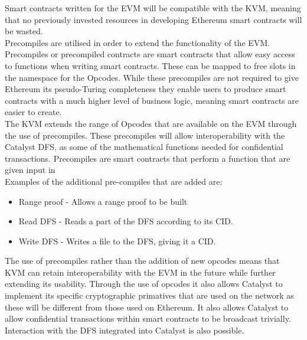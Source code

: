 Smart contracts written for the EVM will be compatible with the KVM, meaning that no previously invested resources in developing Ethereum smart contracts will be wasted.  \\

Precompiles are utilised in order to extend the functionality of the EVM. Precompiles or precompiled contracts are smart contracts that allow easy access to functions when writing smart contracts. These can be mapped to free slots in the namespace for the Opcodes. While these precompiles are not required to give Ethereum its pseudo-Turing completeness they enable users to produce smart contracts with a much higher level of business logic, meaning smart contracts are easier to create. \\

The KVM extends the range of Opcodes that are available on the EVM through the use of precompiles. These precompiles will allow interoperability with the Catalyst DFS, as some of the mathematical functions needed for confidential transactions. Precompiles are smart contracts that perform a function that are given input in\\

Examples of the additional pre-compiles that are added are: \\

\begin{itemize} 
\item Range proof - Allows a range proof to be built 
\item Read DFS - Reads a part of the DFS according to its CID.
\item Write DFS - Writes a file to the DFS, giving it a CID. \\
\end{itemize} 

The use of precompiles rather than the addition of new opcodes means that KVM can retain interoperability with the EVM in the future while further extending its usability. Through the use of opcodes it also allows Catalyst to implement its specific cryptographic primatives that are used on the network as these will be different from those used on Ethereum. It also allows Catalyst to allow confidential transactions within smart contracts to be broadcast trivially. Interaction with the DFS integrated into Catalyst is also possible. 